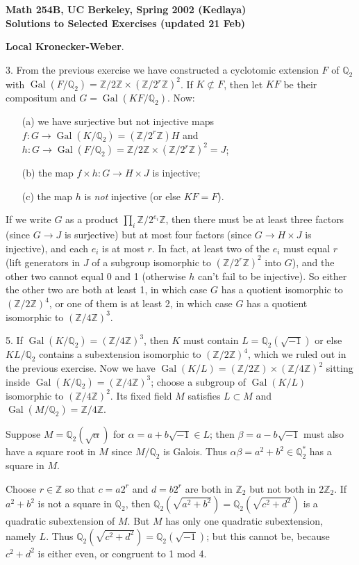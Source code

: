 \documentclass[12pt]{article}
\def\QQ{\mathbb{Q}}
\def\ZZ{\mathbb{Z}}
\DeclareMathOperator{\Gal}{Gal}
\def\head#1{\medskip \noindent \textbf{#1}.}
\begin{document}
\begin{center}
\bf
Math 254B, UC Berkeley, Spring 2002 (Kedlaya) \\
Solutions to Selected Exercises (updated 21 Feb)
\end{center}

\head{Local Kronecker-Weber}

3. From the previous exercise we have constructed a cyclotomic extension $F$
of $\QQ_2$ with $\Gal(F/\QQ_2) = \ZZ/2\ZZ \times (\ZZ/2^r\ZZ)^2$. If
$K \not\subset F$, then let $KF$ be their compositum and $G =
\Gal(KF/\QQ_2)$. Now:
\begin{enumerate}
\item[(a)] we have surjective but not injective maps
$f: G \to \Gal(K/\QQ_2) = (\ZZ/2^r\ZZ)H$ and
$h: G \to \Gal(F/\QQ_2) = \ZZ/2\ZZ \times (\ZZ/2^r \ZZ)^2 = J$;
\item[(b)] the map $f \times h: G \to H \times J$
is injective;
\item[(c)] the map $h$ is \emph{not} injective (or else $KF=F$).
\end{enumerate}
If we write $G$ as a product 
$\prod_i \ZZ/2^{e_i}\ZZ$, then there must be at least three factors 
(since $G \to J$ is surjective) but at most four factors (since $G \to
H \times J$ is injective), and each $e_i$ is at most $r$. In fact,
at least two of the $e_i$ must equal $r$ (lift generators in $J$ of a
subgroup isomorphic to $(\ZZ/2^r\ZZ)^2$ into $G$), and the other two
cannot equal 0 and 1 (otherwise $h$ can't fail to be injective). So
either the other two are both at least 1, in which case $G$ has a quotient
isomorphic to $(\ZZ/2\ZZ)^4$, or one of them is at least 2, in which case
$G$ has a quotient isomorphic to $(\ZZ/4\ZZ)^3$.

5. If $\Gal(K/\QQ_2) = (\ZZ/4\ZZ)^3$, then $K$ must contain
$L = \QQ_2(\sqrt{-1})$ or else $KL/\QQ_2$ contains a subextension isomorphic
to $(\ZZ/2\ZZ)^4$, which we ruled out in the previous exercise. Now
we have $\Gal(K/L) = (\ZZ/2\ZZ) \times (\ZZ/4\ZZ)^2$ sitting inside
$\Gal(K/\QQ_2) = (\ZZ/4\ZZ)^3$; choose a subgroup of $\Gal(K/L)$ isomorphic
to $(\ZZ/4\ZZ)^2$. Its fixed field $M$ satisfies $L \subset M$ and
$\Gal(M/\QQ_2) = \ZZ/4\ZZ$.

Suppose $M = \QQ_2(\sqrt{\alpha})$ for $\alpha = a + b \sqrt{-1} \in L$;
then $\beta = a - b \sqrt{-1}$ must also
have a square root in $M$ since $M/\QQ_2$ is Galois. Thus
$\alpha \beta = a^2+b^2 \in \QQ_2^*$ has a square in $M$.

Choose $r \in \ZZ$ so that $c = a2^r$ and $d = b2^r$
are both in $\ZZ_2$ but not
both in $2\ZZ_2$. If $a^2+b^2$ is not a square in $\QQ_2$, then
$\QQ_2(\sqrt{a^2+b^2}) = \QQ_2(\sqrt{c^2+d^2})$
is a quadratic subextension of $M$. But $M$ has only one quadratic
subextension, namely $L$. Thus $\QQ_2(\sqrt{c^2+d^2}) = \QQ_2(\sqrt{-1})$;
but this cannot be, because $c^2+d^2$ is either even, or congruent to 1
mod 4. 
\end{document}
